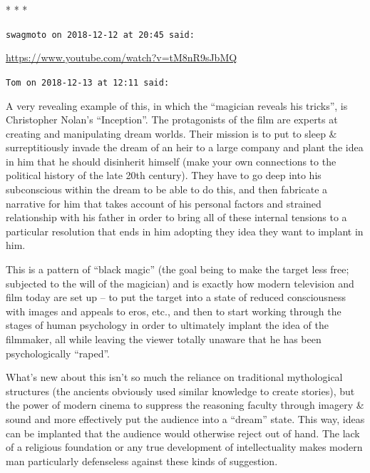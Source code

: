 
\begin{center}* * *\end{center}

\begin{footnotesize}
\begin{sffamily}
\texttt{swagmoto on 2018-12-12 at 20:45 said:}

\url{https://www.youtube.com/watch?v=tM8nR9sJbMQ}


\hfill

\texttt{Tom on 2018-12-13 at 12:11 said:}

A very revealing example of this, in which the ``magician reveals his tricks'', is Christopher Nolan's ``Inception''. The protagonists of the film are experts at creating and manipulating dream worlds. Their mission is to put to sleep \& surreptitiously invade the dream of an heir to a large company and plant the idea in him that he should disinherit himself (make your own connections to the political history of the late 20th century). They have to go deep into his subconscious within the dream to be able to do this, and then fabricate a narrative for him that takes account of his personal factors and strained relationship with his father in order to bring all of these internal tensions to a particular resolution that ends in him adopting they idea they want to implant in him.

This is a pattern of ``black magic'' (the goal being to make the target less free; subjected to the will of the magician) and is exactly how modern television and film today are set up -- to put the target into a state of reduced consciousness with images and appeals to eros, etc., and then to start working through the stages of human psychology in order to ultimately implant the idea of the filmmaker, all while leaving the viewer totally unaware that he has been psychologically ``raped''.

What's new about this isn't so much the reliance on traditional mythological structures (the ancients obviously used similar knowledge to create stories), but the power of modern cinema to suppress the reasoning faculty through imagery \& sound and more effectively put the audience into a ``dream'' state. This way, ideas can be implanted that the audience would otherwise reject out of hand. The lack of a religious foundation or any true development of intellectuality makes modern man particularly defenseless against these kinds of suggestion.


\end{sffamily}
\end{footnotesize}
